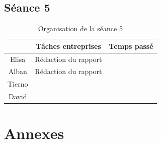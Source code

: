\documentclass{rapport}
\begin{document}
\subsection{Séance 5} %

\begin{table}[htbp]
	\centering 
	\begin{tabular}{c|c|c}
		& Tâches entreprises& Temps passé\\ \hline
		Elisa& Rédaction du rapport & \\ \hline
		Alban& Rédaction du rapport & \\ \hline
		Tierno& & \\ \hline
		David& & 
	\end{tabular}
	\caption{Organisation de la séance 5}
\end{table}

\newpage

\section{Annexes}

\lstset{style=mystyle}
\end{document}
